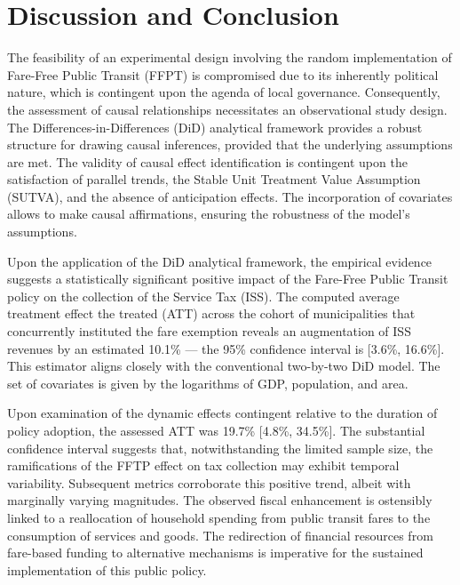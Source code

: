 \documentclass[12pt, a4paper, twoside]{article}
\numberwithin{equation}{subsection} %
\begin{document}
\newpage

\hypertarget{sec-disc-conclusions}{%
\section{Discussion and Conclusion}\label{sec-disc-conclusions}}

The feasibility of an experimental design involving the random
implementation of Fare-Free Public Transit (FFPT) is compromised due to
its inherently political nature, which is contingent upon the agenda of
local governance. Consequently, the assessment of causal relationships
necessitates an observational study design. The
Differences-in-Differences (DiD) analytical framework provides a robust
structure for drawing causal inferences, provided that the underlying
assumptions are met. The validity of causal effect identification is
contingent upon the satisfaction of parallel trends, the Stable Unit
Treatment Value Assumption (SUTVA), and the absence of anticipation
effects. The incorporation of covariates allows to make causal
affirmations, ensuring the robustness of the model's assumptions.

Upon the application of the DiD analytical framework, the empirical
evidence suggests a statistically significant positive impact of the
Fare-Free Public Transit policy on the collection of the Service Tax
(ISS). The computed average treatment effect the treated (ATT) across
the cohort of municipalities that concurrently instituted the fare
exemption reveals an augmentation of ISS revenues by an estimated 10.1\%
--- the 95\% confidence interval is {[}3.6\%, 16.6\%{]}. This estimator
aligns closely with the conventional two-by-two DiD model. The set of
covariates is given by the logarithms of GDP, population, and area.

Upon examination of the dynamic effects contingent relative to the
duration of policy adoption, the assessed ATT was 19.7\% {[}4.8\%,
34.5\%{]}. The substantial confidence interval suggests that,
notwithstanding the limited sample size, the ramifications of the FFTP
effect on tax collection may exhibit temporal variability. Subsequent
metrics corroborate this positive trend, albeit with marginally varying
magnitudes. The observed fiscal enhancement is ostensibly linked to a
reallocation of household spending from public transit fares to the
consumption of services and goods. The redirection of financial
resources from fare-based funding to alternative mechanisms is
imperative for the sustained implementation of this public policy.
\end{document}
